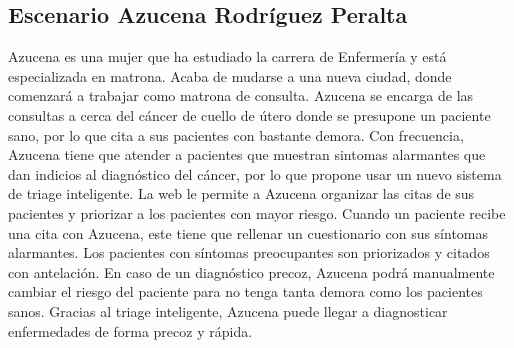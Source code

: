 \subsection{Escenario Azucena Rodríguez Peralta}
    Azucena es una mujer que ha estudiado la carrera de Enfermería y está especializada en matrona.
    Acaba de mudarse a una nueva ciudad, donde comenzará a trabajar como matrona de consulta. Azucena se encarga
    de las consultas a cerca del cáncer de cuello de útero donde se presupone un paciente sano, por lo que cita
    a sus pacientes con bastante demora. Con frecuencia, Azucena tiene que atender a pacientes que muestran sintomas
    alarmantes que dan indicios al diagnóstico del cáncer, por lo que propone usar un nuevo sistema de triage inteligente.
    La web le permite a Azucena organizar las citas de sus pacientes y priorizar a los pacientes con mayor riesgo.
    Cuando un paciente recibe una cita con Azucena, este tiene que rellenar un cuestionario con sus síntomas alarmantes.
    Los pacientes con síntomas preocupantes son priorizados y citados con antelación. En caso de un diagnóstico precoz,
    Azucena podrá manualmente cambiar el riesgo del paciente para no tenga tanta demora como los pacientes sanos.
    Gracias al triage inteligente, Azucena puede llegar a diagnosticar enfermedades de forma precoz y rápida.
